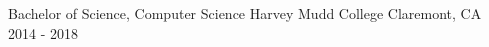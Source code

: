 

\begin{cventries}

  \cventry
    {Bachelor of Science, Computer Science} %
    {Harvey Mudd College} %
    {Claremont, CA} %
    {2014 - 2018} %
    {}


\end{cventries}
